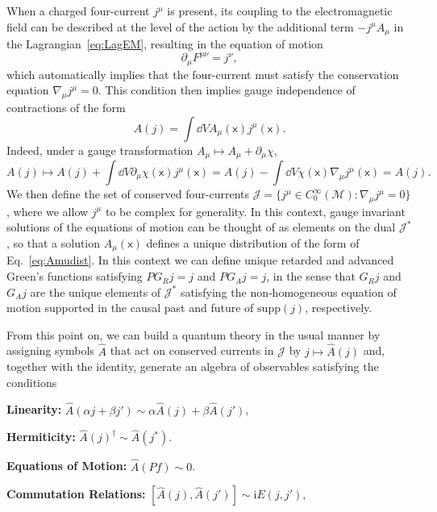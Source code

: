 \documentclass[letterpaper,12pt,titlepage,oneside,final]{book}
\newcommand{\M}{\mathcal{M}}
\newcommand{\mf}{\mathsf}%
\newcommand{\ii}{\mathrm{i}}
\begin{document}
When a charged four-current $j^\mu$ is present, its coupling to the electromagnetic field can be described at the level of the action by the additional term $-j^\mu A_\mu$ in the Lagrangian~\eqref{eq:LagEM}, resulting in the equation of motion
\begin{equation}
    \partial_\mu F^{\mu\nu} = j^\nu,
\end{equation}
which automatically implies that the four-current must satisfy the conservation equation $\nabla_\mu j^\mu = 0$. This condition then implies gauge independence of contractions of the form
\begin{equation}\label{eq:Amudist}
    A(j) = \int \dd V A_\mu(\mf x) j^\mu(\mf x).
\end{equation}
Indeed, under a gauge transformation $A_\mu \mapsto A_\mu + \partial_\mu \chi$, 
\begin{equation}
    A(j) \mapsto A(j) + \int \dd V \partial_\mu \chi(\mf x) j^\mu(\mf x) = A(j) - \int \dd V \chi(\mf x) \nabla_\mu j^\mu(\mf x) = A(j).
\end{equation}
We then define the set of conserved four-currents $\mathcal{J} = \{j^\mu\in C_0^\infty(\M): \nabla_\mu j^\mu = 0\}$, where we allow $j^\mu$ to be complex for generality. In this context, gauge invariant solutions of the equations of motion can be thought of as elements on the dual $\mathcal{J}^*$, so that a solution $A_\mu(\mf x)$ defines a unique distribution of the form of Eq.~\eqref{eq:Amudist}. In this context we can define unique retarded and advanced Green's functions satisfying $PG_Rj = j$ and $PG_A j = j$, in the sense that $G_Rj$ and $G_Aj$ are the unique elements of $\mathcal{J}^*$ satisfying the non-homogeneous equation of motion supported in the causal past and future of $\text{supp}(j)$, respectively.

From this point on, we can build a quantum theory in the usual manner by assigning symbols $\hat{A}$ that act on conserved currents in $\mathcal{J}$ by $j \mapsto \hat{A}(j)$ and, together with the identity, generate an algebra of observables satisfying the conditions

\noindent \textbf{Linearity:} $\hat{A}(\alpha j + \beta j') \sim \alpha \hat{A}(j) + \beta \hat{A}(j')$,

\noindent \textbf{Hermiticity:} $\hat{A}(j)^\dagger \sim \hat{A}(j^*)$.

\noindent \textbf{Equations of Motion:} $\hat{A}(Pf) \sim 0$.

\noindent \textbf{Commutation Relations:} $[\hat{A}(j),\hat{A}(j')] \sim \ii E(j,j')$,
\end{document}
